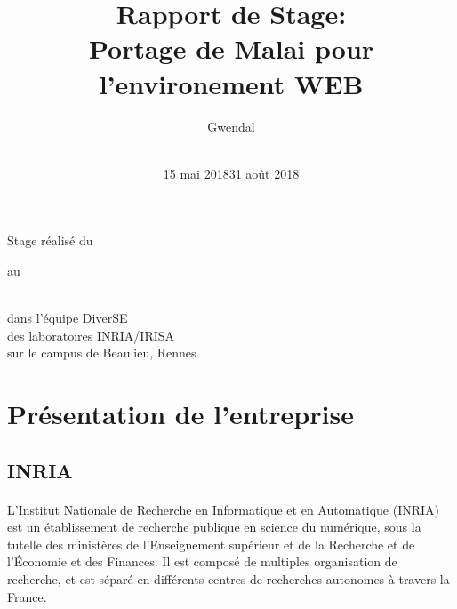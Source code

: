 \documentclass[11pt, a4paper, pdftex]{article}
\begin{document}

    \title{Rapport de Stage: \\ Portage de Malai pour l'environement WEB}
    \author{Gwendal 
    \\
    \\
    }

    \maketitle
    \begin{center}
        Stage réalisé du \date{15 mai 2018} au \date{31 août 2018} \\ dans l'équipe DiverSE \\ des laboratoires INRIA/IRISA \\ sur le campus de Beaulieu, Rennes
    \end{center}
    \thispagestyle{empty}
    \newpage

    \tableofcontents

    \fancyhf{}
    \pagestyle{fancy}
    \fancyhead[C]{\leftmark}
    \fancyfoot[C]{\thepage/\pageref{LastPage}}
    \newpage
    \section{Présentation de l'entreprise}\label{sec:presentr}
    \vspace{1cm}
        \subsection{INRIA}\label{subsec:inria}
            \paragraph{}
                L'Institut Nationale de Recherche en Informatique et en Automatique (INRIA) est un établissement de recherche publique en science du numérique,
                sous la tutelle des ministères de l'Enseignement supérieur et de la Recherche et de l'Économie et des Finances.
                Il est composé de multiples organisation de recherche, et est séparé en différents centres de recherches autonomes à travers la France.
    \vspace{1cm}
\end{document}
